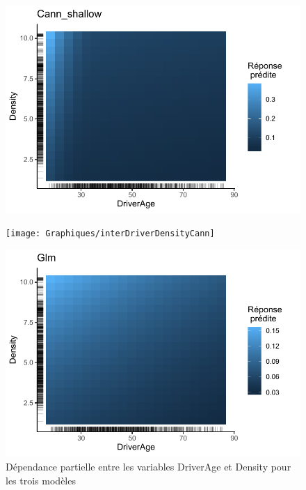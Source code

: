 \begin{figure}
\caption{\label{fig:inter3DriveDensity} Dépendance partielle entre les variables DriverAge et Density pour les trois modèles}
\centering
\begin{minipage}{0.45\linewidth}
\includegraphics[scale=0.6]{Graphiques/interDriverDensityShallow}
\end{minipage}
\hfill
\begin{minipage}{0.45\linewidth}
\texttt{[image: Graphiques/interDriverDensityCann]}
\end{minipage}
\hfill
\begin{minipage}{0.45\linewidth}
\includegraphics[scale=0.6]{Graphiques/interDriverDensityGlm}
\end{minipage}
\end{figure}